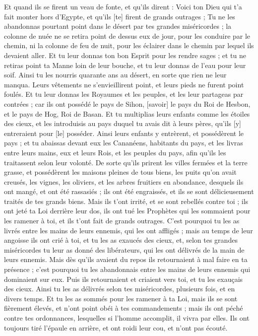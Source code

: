\begin{multicols}{2}
{Et quand ils se firent un veau de fonte, et qu'ils dirent : Voici ton Dieu qui t'a fait monter hors d'Egypte, et qu'ils [te] firent de grands outrages ;
Tu ne les abandonnas pourtant point dans le désert par tes grandes miséricordes ; la colonne de nuée ne se retira point de dessus eux de jour, pour les conduire par le chemin, ni la colonne de feu de nuit, pour les éclairer dans le chemin par lequel ils devaient aller.
Et tu leur donnas ton bon Esprit pour les rendre sages ; et tu ne retiras point ta Manne loin de leur bouche, et tu leur donnas de l'eau pour leur soif.
Ainsi tu les nourris quarante ans au désert, en sorte que rien ne leur manqua. Leurs vêtements ne s'envieillirent point, et leurs pieds ne furent point foulés.
Et tu leur donnas les Royaumes et les peuples, et les leur partageas par contrées ; car ils ont possédé le pays de Sihon, [savoir] le pays du Roi de Hesbon, et le pays de Hog, Roi de Basan.
Et tu multiplias leurs enfants comme les étoiles des cieux, et les introduisis au pays duquel tu avais dit à leurs pères, qu'ils [y] entreraient pour [le] posséder.
Ainsi leurs enfants y entrèrent, et possédèrent le pays ; et tu abaissas devant eux les Cananéens, habitants du pays, et les livras entre leurs mains, eux et leurs Rois, et les peuples du pays, afin qu'ils les traitassent selon leur volonté.
De sorte qu'ils prirent les villes fermées et la terre grasse, et possédèrent les maisons pleines de tous biens, les puits qu'on avait creusés, les vignes, les oliviers, et les arbres fruitiers en abondance, desquels ils ont mangé, et ont été rassasiés ; ils ont été engraissés, et ils se sont délicieusement traités de tes grands biens.
Mais ils t'ont irrité, et se sont rebellés contre toi ; ils ont jeté ta Loi derrière leur dos, ils ont tué les Prophètes qui les sommaient pour les ramener à toi, et ils t'ont fait de grands outrages.
C'est pourquoi tu les as livrés entre les mains de leurs ennemis, qui les ont affligés ; mais au temps de leur angoisse ils ont crié à toi, et tu les as exaucés des cieux, et, selon tes grandes miséricordes tu leur as donné des libérateurs, qui les ont délivrés de la main de leurs ennemis.
Mais dès qu'ils avaient du repos ils retournaient à mal faire en ta présence ; c'est pourquoi tu les abandonnais entre les mains de leurs ennemis qui dominaient sur eux. Puis ils retournaient et criaient vers toi, et tu les exauçais des cieux. Ainsi tu les as délivrés selon tes miséricordes, plusieurs fois, et en divers temps.
Et tu les as sommés pour les ramener à ta Loi, mais ils se sont fièrement élevés, et n'ont point obéi à tes commandements ; mais ils ont péché contre tes ordonnances, lesquelles si l'homme accomplit, il vivra par elles. Ils ont toujours tiré l'épaule en arrière, et ont roidi leur cou, et n'ont pas écouté.
}
\end{multicols}
